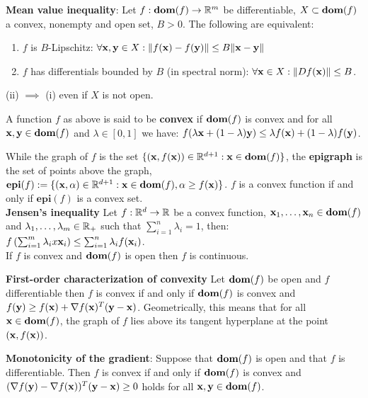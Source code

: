 \begin{framed}
    \textbf{Mean value inequality}: Let $f : \textbf{dom}(f) \rightarrow \mathbb{R}^m$ be differentiable, $X \subset \textbf{dom}(f)$ a convex, nonempty and open set, $B > 0$. The following are equivalent:
    \begin{enumerate}[label=(\roman*), topsep=0pt,itemsep=0ex,partopsep=0ex,parsep=0ex]   
        \itemsep0em
        \item $f$ is $B$-Lipschitz: $\forall \mathbf{x}, \mathbf{y} \in X : \norm{f(\mathbf{x}) - f(\mathbf{y})} \leq B \norm{\mathbf{x} - \mathbf{y}}$
        \item $f$ has differentials bounded by $B$ (in spectral norm): $\forall \mathbf{x} \in X: \norm{D f(\mathbf{x})} \leq B$.
    \end{enumerate}
    (ii) $\implies$ (i) even if $X$ is not open.
\end{framed}
\begin{framed}
    A function $f$ as above is said to be \textbf{convex} if $\textbf{dom}(f)$ is convex and for all $\mathbf{x}, \mathbf{y} \in \textbf{dom}(f)$ and $\lambda \in [0, 1]$ we have: $f(\lambda \mathbf{x} + (1 - \lambda)\mathbf{y}) \leq \lambda f(\mathbf{x}) + (1 - \lambda) f(\mathbf{y})$.   
\end{framed}
While the graph of $f$ is the set $\{(\mathbf{x}, f (\mathbf{x})) \in \mathbb{R}^{d+1} : \mathbf{x} \in \textbf{dom}(f)\}$, the \textbf{epigraph} is the set of points above the graph, $\textbf{epi}(f) := \{(\mathbf{x}, \alpha) \in \mathbb{R}^{d+1} : \mathbf{x} \in \textbf{dom}(f), \alpha \geq f(\mathbf{x})\}$. $f$ is a convex function if and only if $\textbf{epi}(f)$ is a convex set. \\
\textbf{Jensen's inequality} Let $f : \mathbb{R}^d \rightarrow \mathbb{R}$ be a convex function, $\mathbf{x}_1, \dots, \mathbf{x}_n \in \textbf{dom}(f)$ and $\lambda_1, \dots, \lambda_m \in \mathbb{R}_{+}$ such that $\sum_{i=1}^n{\lambda_i}=1$, then: $f\left(\sum_{i=1}^m{\lambda_i x\mathbf{x}_i} \right) \leq \sum_{i=1}^n{\lambda_i f(\mathbf{x}_i)}$. \\
If $f$ is convex and $\textbf{dom}(f)$ is open then $f$ is continuous.\\
\begin{framed}
    \textbf{First-order characterization of convexity} Let $\textbf{dom}(f)$ be open and $f$ differentiable then $f$ is convex if and only if $\textbf{dom}(f)$ is convex and $f(\mathbf{y}) \geq f(\mathbf{x}) + \nabla f(\mathbf{x})^T (\mathbf{y} - \mathbf{x})$. Geometrically, this means that for all $\mathbf{x} \in \textbf{dom}(f)$, the graph of $f$ lies above its tangent hyperplane at the point $(\mathbf{x}, f(\mathbf{x}))$.
\end{framed}
\textbf{Monotonicity of the gradient}: Suppose that $\textbf{dom}(f)$ is open and that $f$ is differentiable. Then $f$ is convex if and only if $\textbf{dom}(f)$ is convex and $(\nabla f(\mathbf{y}) - \nabla f(\mathbf{x}))^T (\mathbf{y} - \mathbf{x}) \geq 0$ holds for all $\mathbf{x}, \mathbf{y} \in \textbf{dom}(f)$.
